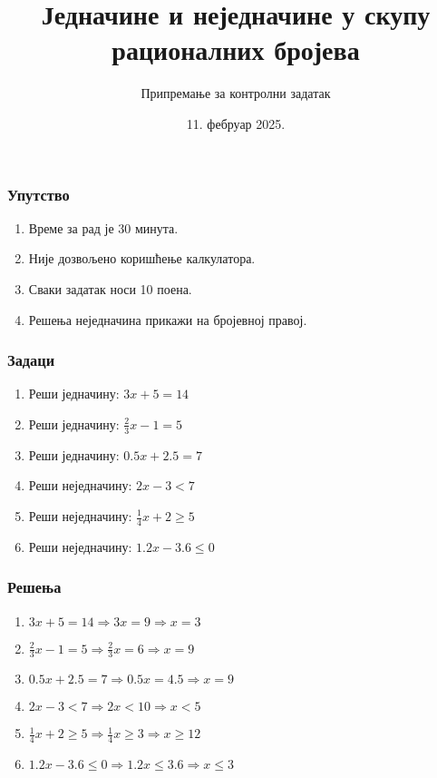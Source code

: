 \documentclass[11pt]{beamer}
\title{Једначине и неједначине у скупу рационалних бројева}
\author{Припремање за контролни задатак}
\institute{ОШ „Иван Горан Ковачић“, Станишић}
\date{11. фебруар 2025.}
\begin{document}
\begin{frame}
    \titlepage
\end{frame}

\begin{frame}
    \frametitle{Упут{}ство}
    \begin{enumerate}
        \item Време за рад је 30 минута.
        \item Није дозвољено коришћење калкулатора.
        \item Сваки задатак носи 10 поена.
        \item Решења неједначина прикажи на бројевној правој.
    \end{enumerate}
\end{frame}

\begin{frame}
    \frametitle{Задаци}

    \begin{enumerate}
        \item Реши једначину: $3x + 5 = 14$
        \item Реши једначину: $\frac{2}{3}x - 1 = 5$
        \item Реши једначину: $0.5x + 2.5 = 7$
        \item Реши неједначину: $2x - 3 < 7$
        \item Реши неједначину: $\frac{1}{4}x + 2 \geq 5$
        \item Реши неједначину: $1.2x - 3.6 \leq 0$
    \end{enumerate}

\end{frame}

\begin{frame}
    \frametitle{Решења}

    \begin{enumerate}
        \item $3x + 5 = 14 \Rightarrow 3x = 9 \Rightarrow x = 3$
        \item $\frac{2}{3}x - 1 = 5 \Rightarrow \frac{2}{3}x = 6 \Rightarrow x = 9$
        \item $0.5x + 2.5 = 7 \Rightarrow 0.5x = 4.5 \Rightarrow x = 9$
        \item $2x - 3 < 7 \Rightarrow 2x < 10 \Rightarrow x < 5$
        \item $\frac{1}{4}x + 2 \geq 5 \Rightarrow \frac{1}{4}x \geq 3 \Rightarrow x \geq 12$
        \item $1.2x - 3.6 \leq 0 \Rightarrow 1.2x \leq 3.6 \Rightarrow x \leq 3$
    \end{enumerate}

\end{frame}
\end{document}
